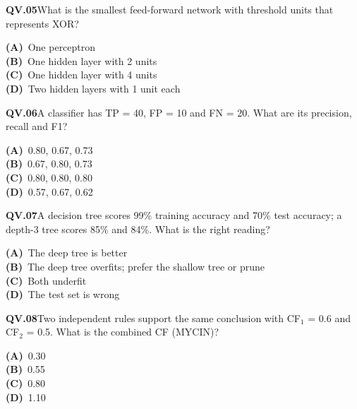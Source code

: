 \documentclass[11pt]{article}
\begin{document}
\begin{tcolorbox}[enhanced,breakable,colback=white,colframe=navyL,arc=2mm,boxrule=0.7pt,left=3mm,right=3mm,top=2mm,bottom=2mm]
\textbf{\color{navy}QV.05}\quad What is the smallest feed-forward network with threshold units that represents XOR?\hfill{}\par\smallskip
{\small \textbf{\color{navyL}(A)}\ One perceptron\\[1pt]\textbf{\color{navyL}(B)}\ One hidden layer with 2 units\\[1pt]\textbf{\color{navyL}(C)}\ One hidden layer with 4 units\\[1pt]\textbf{\color{navyL}(D)}\ Two hidden layers with 1 unit each}
\end{tcolorbox}
\begin{tcolorbox}[enhanced,breakable,colback=white,colframe=navyL,arc=2mm,boxrule=0.7pt,left=3mm,right=3mm,top=2mm,bottom=2mm]
\textbf{\color{navy}QV.06}\quad A classifier has TP = 40, FP = 10 and FN = 20. What are its precision, recall and F1?\hfill{}\par\smallskip
{\small \textbf{\color{navyL}(A)}\ 0.80, 0.67, 0.73\\[1pt]\textbf{\color{navyL}(B)}\ 0.67, 0.80, 0.73\\[1pt]\textbf{\color{navyL}(C)}\ 0.80, 0.80, 0.80\\[1pt]\textbf{\color{navyL}(D)}\ 0.57, 0.67, 0.62}
\end{tcolorbox}
\begin{tcolorbox}[enhanced,breakable,colback=white,colframe=navyL,arc=2mm,boxrule=0.7pt,left=3mm,right=3mm,top=2mm,bottom=2mm]
\textbf{\color{navy}QV.07}\quad A decision tree scores 99\% training accuracy and 70\% test accuracy; a depth-3 tree scores 85\% and 84\%. What is the right reading?\hfill{}\par\smallskip
{\small \textbf{\color{navyL}(A)}\ The deep tree is better\\[1pt]\textbf{\color{navyL}(B)}\ The deep tree overfits; prefer the shallow tree or prune\\[1pt]\textbf{\color{navyL}(C)}\ Both underfit\\[1pt]\textbf{\color{navyL}(D)}\ The test set is wrong}
\end{tcolorbox}
\begin{tcolorbox}[enhanced,breakable,colback=white,colframe=navyL,arc=2mm,boxrule=0.7pt,left=3mm,right=3mm,top=2mm,bottom=2mm]
\textbf{\color{navy}QV.08}\quad Two independent rules support the same conclusion with CF$_1$ = 0.6 and CF$_2$ = 0.5. What is the combined CF (MYCIN)?\hfill{}\par\smallskip
{\small \textbf{\color{navyL}(A)}\ 0.30\\[1pt]\textbf{\color{navyL}(B)}\ 0.55\\[1pt]\textbf{\color{navyL}(C)}\ 0.80\\[1pt]\textbf{\color{navyL}(D)}\ 1.10}
\end{tcolorbox}
\end{document}
